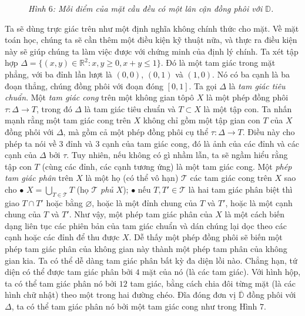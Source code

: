 \begin{multicols}{2}
\begin{figure}[H]
		\caption{\small\textit{\color{duongvaotoanhoc}Hình $6$: Mỗi điểm của mặt cầu đều có một lân cận đồng phôi với $\mathbb{D}$.}}
		\vspace*{-10pt}
	\end{figure}
	Ta sẽ dùng trực giác trên như một định nghĩa không chính thức cho mặt. Về mặt toán học, chúng ta sẽ cần thêm một điều kiện kỹ thuật nữa, và thực ra điều kiện này sẽ giúp chúng ta làm việc được với chứng minh của định lý chính.
	\vskip 0.1cm
	Ta xét tập hợp $\Delta = \{(x,y) \in \mathbb{R}^2: x,y \ge 0, x+y \le 1\}$. Đó là một tam giác trong mặt phẳng, với ba đỉnh lần lượt là $(0,0)$, $(0,1)$ và $(1,0)$. Nó có ba cạnh là ba đoạn thẳng, chúng đồng phôi với đoạn đóng $[0,1]$. Ta gọi $\Delta$ là {\it tam giác tiêu chuẩn}. Một {\it tam giác cong} trên một không gian tôpô $X$ là một phép đồng phôi $\tau: \Delta \to T$, trong đó $\Delta$ là tam giác tiêu chuẩn và $T \subset X$ là một tập con. Ta nhấn mạnh rằng một tam giác cong trên $X$ không chỉ gồm một tập gian con $T$ của $X$ đồng phôi với $\Delta$, mà gồm cả một phép đồng phôi cụ thể $\tau: \Delta \to T$. Điều này cho phép ta nói về $3$ đỉnh và $3$ cạnh của tam giác cong, đó là ảnh của các đỉnh và các cạnh của $\Delta$ bởi $\tau$. Tuy nhiên, nếu không có gì nhầm lẫn, ta sẽ ngầm hiểu rằng tập con $T$ (cùng các đỉnh, các cạnh tương ứng) là một tam giác cong. 
	\vskip 0.1cm
	Một {\it phép tam giác phân} trên $X$ là một họ (có thể vô hạn) $\mathscr{T}$ các tam giác cong trên $X$ sao cho
	\vskip 0.1cm
	$\bullet$ $X = \bigcup_{T \in \mathscr{T}} T$ (họ $\mathscr{T}$ {\it phủ} $X$);
	\vskip 0.1cm
	$\bullet$ nếu $T,T' \in \mathscr{T}$ là hai tam giác phân biệt thì giao $T \cap T'$ hoặc bằng $\varnothing$, hoặc là một đỉnh chung của $T$ và $T'$, hoặc là một cạnh chung của $T$ và $T'$.
	\vskip 0.1cm
	Như vậy, một phép tam giác phân của $X$ là một cách biến dạng liên tục các phiên bản của tam giác chuẩn và dán chúng lại dọc theo các cạnh hoặc các đỉnh để thu được $X$. Dễ thấy một phép đồng phôi sẽ biến một phép tam giác phân của không gian này thành một phép tam phân của không gian kia. Ta có thể dễ dàng tam giác phân bất kỳ đa diện lồi nào. Chẳng hạn, tứ diện có thể được tam giác phân bởi $4$ mặt của nó (là các tam giác). Với hình hộp, ta có thể tam giác phân nó bởi $12$ tam giác, bằng cách chia đôi từng mặt (là các hình chữ nhật) theo một trong hai đường chéo. Đĩa đóng đơn vị $\overline{\mathbb{D}}$ đồng phôi với $\Delta$, ta có thể tam giác phân nó bởi một tam giác cong như trong Hình $7$.
	\begin{figure}[H]
		\vspace*{-5pt}

\end{figure}
\end{multicols}
